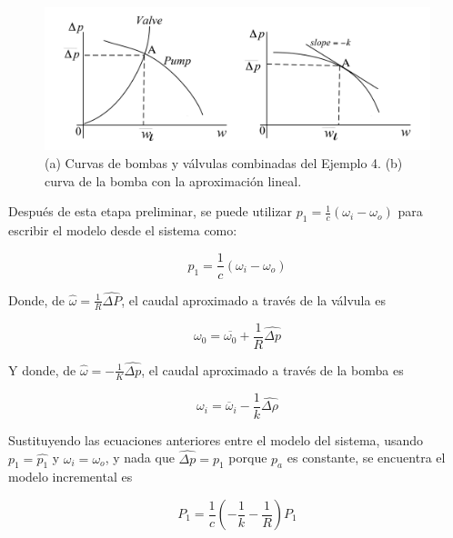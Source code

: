 \documentclass[a4paper,12pt,twoside]{proyectotanquesecci}
\begin{document}
\begin{figure}[h]
\centering
\includegraphics[scale=0.5]{Figura11}
\renewcommand{\figurename}{Fig.}
\caption{(a) Curvas de bombas y válvulas combinadas del Ejemplo 4. (b) curva de la bomba con la aproximación lineal.}
\label{(a) Curvas de bombas y válvulas combinadas del Ejemplo 4. (b) curva de la bomba con la aproximación lineal.}
\end{figure}

Después de esta etapa preliminar, se puede utilizar $p_{1}=\frac{1}{c} \left(\omega_{i}-\omega_{o}\right)$ para escribir el modelo desde el sistema como:

\begin{equation}
p_{1}=\frac{1}{c} \left(\omega_{i}-\omega_{o}\right)
\end{equation}

Donde, de $\widehat {\omega }=\frac {1}{R}\widehat {\Delta P}$, el caudal aproximado a través de la válvula es 

\begin{equation}
\omega _{0}=\overline {\omega _{0}}+\frac {1}{R}\widehat {\Delta p}
\end{equation}

Y donde, de $\widehat {\omega }=-\frac {1}{K}\widehat {\Delta p}$, el caudal aproximado a través de la bomba es

\begin{equation}
\omega _{i}=\overline {\omega }_{i}-\frac {1}{k}\widehat {\Delta \rho }
\end{equation}

Sustituyendo las ecuaciones anteriores entre el modelo del sistema, usando $p_{1}=\widehat {p_{1}}$ y $\omega_{i}=\omega_{o}$, y nada que $\widehat {\Delta p}=p_{1}$ porque $p_{a}$ es constante, se encuentra el modelo incremental es 

\begin{equation}
P_{1}=\frac {1}{c}\left( -\frac {1}{k}-\frac {1}{R}\right) P_{1}
\end{equation}
\end{document}
